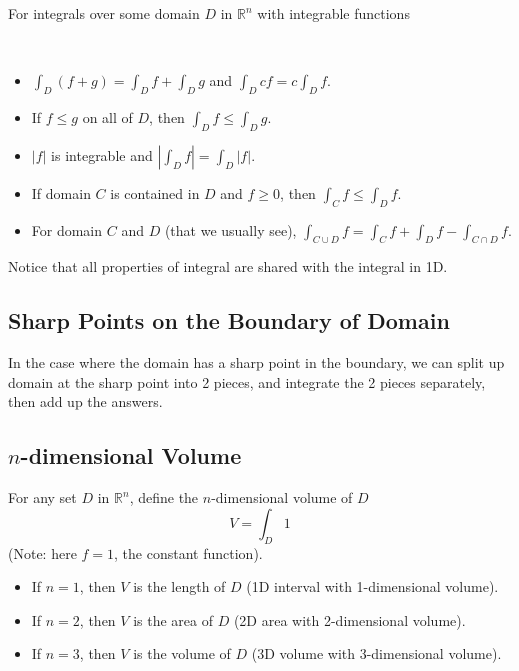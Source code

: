 \documentclass[11pt,fleqn]{book} %
\begin{document}
For integrals over some domain $D$ in $\mathbb{R}^n$ with integrable functions 

{~~~}

\begin{itemize}
    \item $\int_D(f + g) = \int_D f + \int_D g$ and $\int_D cf = c \int_D f$.
    
    \item If $f \le g$ on all of $D$, then $\int_D f \le \int_D g$. 
    
    \item $|f|$ is integrable and $\left| \int_D f \right| = \int_D |f|$. 

    \item If domain $C$ is contained in $D$ and $f \ge 0$, then $\int_C f \le \int_D f$. 
    
    \item For domain $C$ and $D$ (that we usually see), $\int_{C \cup D} f = \int_C f + \int_D f - \int_{C \cap D} f$. 
\end{itemize}

Notice that all properties of integral are shared with the integral in 1D.

\subsection*{Sharp Points on the Boundary of Domain}

In the case where the domain has a sharp point in the boundary, we can split up domain at the sharp point into 2 pieces, and integrate the 2 pieces separately, then add up the answers.

\subsection*{$n$-dimensional Volume}

For any set $D$ in $\mathbb{R}^n$, define the $n$-dimensional volume of $D$ $$V = \int_D 1$$ (Note: here $f = 1$, the constant function). 

\begin{itemize}
    \item If $n = 1$, then $V$ is the length of $D$ (1D interval with 1-dimensional volume). 
    \item If $n = 2$, then $V$ is the area of $D$ (2D area with 2-dimensional volume). 
    \item If $n = 3$, then $V$ is the volume of $D$ (3D volume with 3-dimensional volume). 
\end{itemize}
\end{document}
